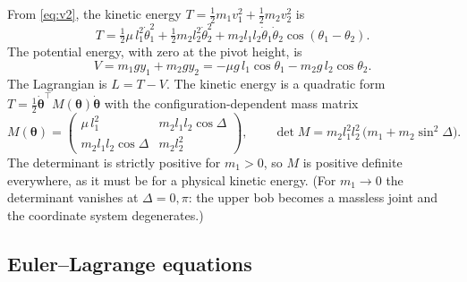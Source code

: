 \documentclass[11pt,a4paper]{book}
\theoremstyle{definition}
\theoremstyle{remark}
\begin{document}
From \eqref{eq:v2}, the kinetic energy $T=\tfrac12m_1v_1^2+\tfrac12m_2v_2^2$ is
\begin{equation}
  T=\tfrac12\mu\,l_1^2\dot\theta_1^2+\tfrac12m_2l_2^2\dot\theta_2^2+m_2l_1l_2\dot\theta_1\dot\theta_2\cos(\theta_1-\theta_2).
  \label{eq:T}
\end{equation}
The potential energy, with zero at the pivot height, is
\begin{equation}
  V=m_1gy_1+m_2gy_2=-\mu g\,l_1\cos\theta_1-m_2g\,l_2\cos\theta_2 .
  \label{eq:V}
\end{equation}
The Lagrangian is $L=T-V$. The kinetic energy is a quadratic form $T=\tfrac12\dot{\bm\theta}^{\!\top}M(\bm\theta)\dot{\bm\theta}$
with the configuration-dependent mass matrix
\begin{equation}
  M(\bm\theta)=
  \begin{pmatrix}
    \mu\,l_1^2 & m_2l_1l_2\cos\Delta\\[2pt]
    m_2l_1l_2\cos\Delta & m_2l_2^2
  \end{pmatrix},
  \qquad
  \det M=m_2l_1^2l_2^2\,\big(m_1+m_2\sin^2\Delta\big).
  \label{eq:M}
\end{equation}
The determinant is strictly positive for $m_1>0$, so $M$ is positive definite everywhere, as it must be for a
physical kinetic energy. (For $m_1\to0$ the determinant vanishes at $\Delta=0,\pi$: the upper bob becomes a
massless joint and the coordinate system degenerates.)

\subsection{Euler--Lagrange equations}
\end{document}
